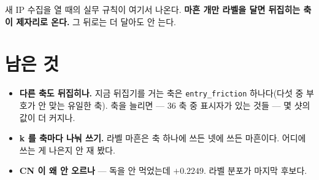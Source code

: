 \documentclass[11pt]{article}
\begin{document}
새 IP 수집을 열 때의 실무 규칙이 여기서 나온다. \textbf{마흔 개만 라벨을
달면 뒤집히는 축이 제자리로 온다.} 그 뒤로는 더 달아도 안 는다.

\section*{남은 것}

\begin{itemize}
\item \textbf{다른 축도 뒤집히나.} 지금 뒤집기를 거는 축은
\texttt{entry\_friction} 하나다(다섯 중 부호가 안 맞는 유일한 축). 축을
늘리면 --- 36 축 중 표시자가 있는 것들 --- 몇 샷의 값이 더 커지나.
\item \textbf{k 를 축마다 나눠 쓰기.} 라벨 마흔은 축 하나에 쓰든 넷에
쓰든 마흔이다. 어디에 쓰는 게 나은지 안 재 봤다.
\item \textbf{CN 이 왜 안 오르나} --- 독을 안 먹었는데 $+0.2249$. 라벨
분포가 마지막 후보다.
\end{itemize}
\end{document}
